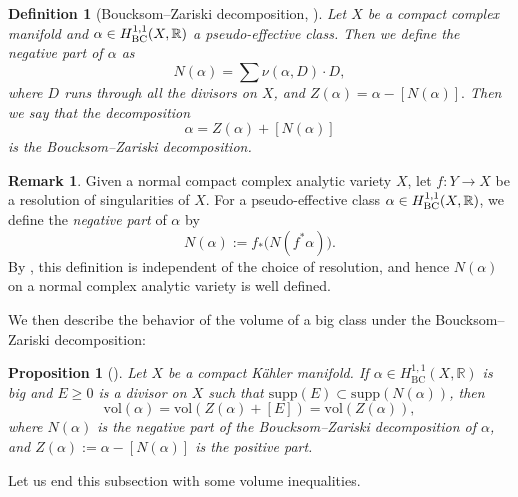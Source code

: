 \documentclass[12pt]{amsart}
\numberwithin{equation}{section}
\newtheorem{proposition}[theorem]{Proposition}
\theoremstyle{definition}
\theoremstyle{plain}
\newtheorem{definition}  [theorem]     {Definition}
\newtheorem*{thm A*}{Theorem A}
\newtheorem*{thm B*}{Theorem B}
\newtheorem*{thm C*}{Theorem C}
\newtheorem*{thm D*}{Theorem D}
\theoremstyle{definition}
\newtheorem{remark}  [theorem]     {Remark}
\renewcommand{\1}{\mathds{1}}
\newcommand{\vol}{\mathrm{vol}}
\renewcommand{\>}{\rightarrow}
\begin{document}
\begin{definition}[{Boucksom--Zariski decomposition, \cite[Definition 3.7]{Boucksom04}}]
Let $X$ be a compact complex manifold and $\alpha\in H^{1,1}_{\rm{BC}}(X,\mathbb{R})$ a pseudo-effective class. Then we define the \emph{negative part} of $\alpha$ as $$N(\alpha) = \sum  \nu (\alpha , D)\cdot D,$$
where $D$ runs through all the divisors on $X$,  
and $Z(\alpha) = \alpha  - [N(\alpha)].$ 
Then we say that the decomposition 
$$\alpha = Z(\alpha)+ [N(\alpha)]$$ 
is the \emph{Boucksom--Zariski decomposition}. 
\end{definition}
\begin{remark}\label{NegZariski}
Given a normal compact complex analytic variety $X$, let $f \colon Y \to X$ be a resolution of singularities of $X$. For a pseudo-effective class $\alpha\in H^{1,1}_{\rm{BC}}(X,\mathbb{R})$, we define the \emph{negative part} of $\alpha$ by
$$
N(\alpha) := f_*\bigl(N(f^*\alpha)\bigr).
$$
By \cite[Lemma A.7]{DHY23}, this definition is independent of the choice of resolution, and hence $N(\alpha)$ on a normal complex analytic variety is well defined.
\end{remark}
We then describe the behavior of the volume of a big class under the Boucksom--Zariski decomposition:
\begin{proposition}[{\cite[Proposition 3.20]{Boucksom04}}]\label{VolZariski}
Let $X$ be a compact K\"ahler manifold. 
If $\alpha \in H^{1,1}_{\mathrm{BC}}(X, \mathbb{R})$ is big and $E \ge 0$ is a divisor on $X$ such that 
$\mathrm{supp}(E) \subset \mathrm{supp}(N(\alpha))$, then
\[
\mathrm{vol}(\alpha) = \mathrm{vol}(Z(\alpha) + [E]) = \mathrm{vol}(Z(\alpha)),
\]
where $N(\alpha)$ is the negative part of the Boucksom--Zariski decomposition of $\alpha$, 
and $Z(\alpha) := \alpha - [N(\alpha)]$ is the positive part.
\end{proposition}
Let us end this subsection with some volume inequalities.
\end{document}

